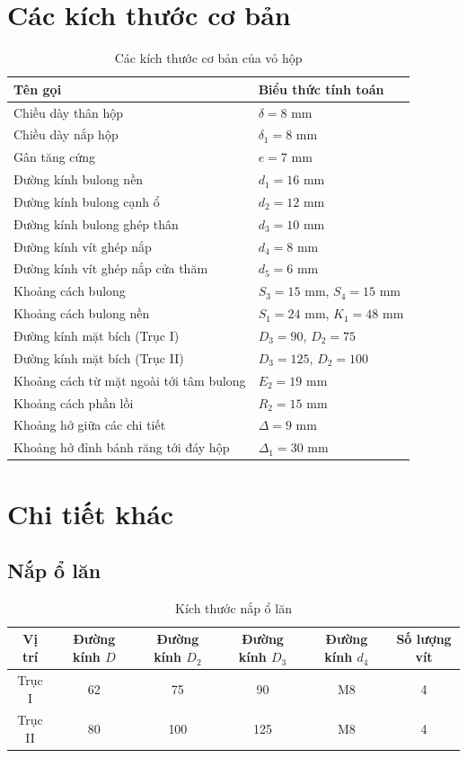 \documentclass[12pt,a4paper]{report}
\begin{document}
\section{Các kích thước cơ bản}
\begin{table}[H]
    \centering
    \caption{Các kích thước cơ bản của vỏ hộp}
    \label{tab:5.1}
    \begin{tabular}{|m{8cm}|m{6cm}|}
        \hline
        \textbf{Tên gọi} & \textbf{Biểu thức tính toán} \\
        \hline
        Chiều dày thân hộp & $\delta = 8$ mm \\
        Chiều dày nắp hộp & $\delta_1 = 8$ mm \\
        Gân tăng cứng & $e = 7$ mm \\
        Đường kính bulong nền & $d_1 = 16$ mm \\
        Đường kính bulong cạnh ổ & $d_2 = 12$ mm \\
        Đường kính bulong ghép thân & $d_3 = 10$ mm \\
        Đường kính vít ghép nắp & $d_4 = 8$ mm \\
        Đường kính vít ghép nắp cửa thăm & $d_5 = 6$ mm \\
        Khoảng cách bulong & $S_3 = 15$ mm, $S_4 = 15$ mm \\
        Khoảng cách bulong nền & $S_1 = 24$ mm, $K_1 = 48$ mm \\
        Đường kính mặt bích (Trục I) & $D_3 = 90$, $D_2 = 75$ \\
        Đường kính mặt bích (Trục II) & $D_3 = 125$, $D_2 = 100$ \\
        Khoảng cách từ mặt ngoài tới tâm bulong & $E_2 = 19$ mm \\
        Khoảng cách phần lồi & $R_2 = 15$ mm \\
        Khoảng hở giữa các chi tiết & $\Delta = 9$ mm \\
        Khoảng hở đỉnh bánh răng tới đáy hộp & $\Delta_1 = 30$ mm \\
        \hline
    \end{tabular}
\end{table}

\section{Chi tiết khác}

\subsection{Nắp ổ lăn}
\begin{table}[H]
    \centering
    \caption{Kích thước nắp ổ lăn}
    \label{tab:5.2}
    \begin{tabular}{|c|c|c|c|c|c|}
        \hline
        Vị trí & Đường kính $D$ & Đường kính $D_2$ & Đường kính $D_3$ & Đường kính $d_4$ & Số lượng vít \\
        \hline
        Trục I & 62 & 75 & 90 & M8 & 4 \\
        Trục II & 80 & 100 & 125 & M8 & 4 \\
        \hline
    \end{tabular}
\end{table}
\end{document}

